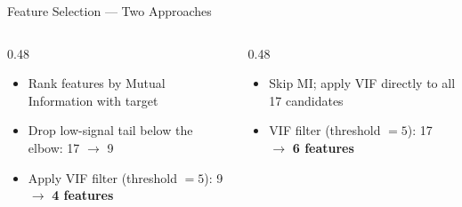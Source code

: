 \begin{frame}{Feature Selection — Two Approaches}
  \begin{columns}[t]
    \begin{column}{0.48\textwidth}
      \begin{itemize}[<2->]
        \item Rank features by Mutual Information with target
        \item Drop low-signal tail below the elbow: 17 $\to$ 9
        \item Apply VIF filter (threshold $= 5$): 9 $\to$ \textbf{4 features}
      \end{itemize}
    \end{column}
    \begin{column}{0.48\textwidth}
      \begin{itemize}
        \item<3-> Skip MI; apply VIF directly to all 17 candidates
        \item<3-> VIF filter (threshold $= 5$): 17 $\to$ \textbf{6 features}
      \end{itemize}
    \end{column}
  \end{columns}
  \vspace{0.5em}
\end{frame}
